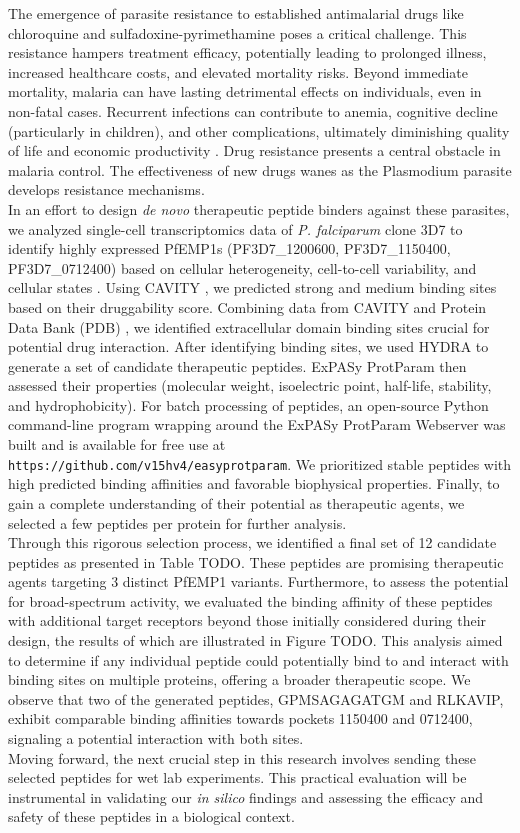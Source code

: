 The emergence of parasite resistance to established antimalarial drugs like chloroquine and sulfadoxine-pyrimethamine poses a critical challenge. This resistance hampers treatment efficacy, potentially leading to prolonged illness, increased healthcare costs, and elevated mortality risks. Beyond immediate mortality, malaria can have lasting detrimental effects on individuals, even in non-fatal cases. Recurrent infections can contribute to anemia, cognitive decline (particularly in children), and other complications, ultimately diminishing quality of life and economic productivity \cite{shukla2023supervised}. Drug resistance presents a central obstacle in malaria control. The effectiveness of new drugs wanes as the Plasmodium parasite develops resistance mechanisms. \\

In an effort to design \textit{de novo} therapeutic peptide binders against these parasites, we analyzed single-cell transcriptomics data of \textit{P. falciparum} clone 3D7 to identify highly expressed PfEMP1s (PF3D7\_1200600, PF3D7\_1150400, PF3D7\_0712400) based on cellular heterogeneity, cell-to-cell variability, and cellular states \cite{choudhuri2024computational}. Using CAVITY \cite{Yuan2013}, we predicted strong and medium binding sites based on their druggability score. Combining data from CAVITY and Protein Data Bank (PDB) \cite{Berman2000}, we identified extracellular domain binding sites crucial for potential drug interaction. After identifying binding sites, we used HYDRA to generate a set of candidate therapeutic peptides. ExPASy ProtParam \cite{gasteiger2003expasy} then assessed their properties (molecular weight, isoelectric point, half-life, stability, and hydrophobicity). For batch processing of peptides, an open-source Python command-line program wrapping around the ExPASy ProtParam Webserver was built and is available for free use at \texttt{https://github.com/v15hv4/easyprotparam}. We prioritized stable peptides with high predicted binding affinities and favorable biophysical properties. Finally, to gain a complete understanding of their potential as therapeutic agents, we selected a few peptides per protein for further analysis. \\

Through this rigorous selection process, we identified a final set of 12 candidate peptides as presented in Table TODO. These peptides are promising therapeutic agents targeting 3 distinct PfEMP1 variants. Furthermore, to assess the potential for broad-spectrum activity, we evaluated the binding affinity of these peptides with additional target receptors beyond those initially considered during their design, the results of which are illustrated in Figure TODO. This analysis aimed to determine if any individual peptide could potentially bind to and interact with binding sites on multiple proteins, offering a broader therapeutic scope. We observe that two of the generated peptides, GPMSAGAGATGM and RLKAVIP, exhibit comparable binding affinities towards pockets 1150400 and 0712400, signaling a potential interaction with both sites. \\

Moving forward, the next crucial step in this research involves sending these selected peptides for wet lab experiments. This practical evaluation will be instrumental in validating our \textit{in silico} findings and assessing the efficacy and safety of these peptides in a biological context. \\
